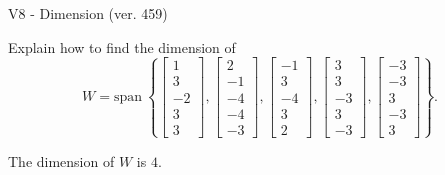 \begin{exercise}
  \begin{exerciseTitle}V8 - Dimension (ver. 459)\end{exerciseTitle}
  \begin{exerciseStatement}
    Explain how to find the dimension of 
\[W=\mathrm{span}\ \left\{\left[\begin{array}{r}
1 \\
3 \\
-2 \\
3 \\
3
\end{array}\right] , \left[\begin{array}{r}
2 \\
-1 \\
-4 \\
-4 \\
-3
\end{array}\right] , \left[\begin{array}{r}
-1 \\
3 \\
-4 \\
3 \\
2
\end{array}\right] , \left[\begin{array}{r}
3 \\
3 \\
-3 \\
3 \\
-3
\end{array}\right] , \left[\begin{array}{r}
-3 \\
-3 \\
3 \\
-3 \\
3
\end{array}\right]\right\}.\]



  \end{exerciseStatement}
  \begin{exerciseAnswer}
   The dimension of \(W\) is  \(4\).
  


  \end{exerciseAnswer}
\end{exercise}